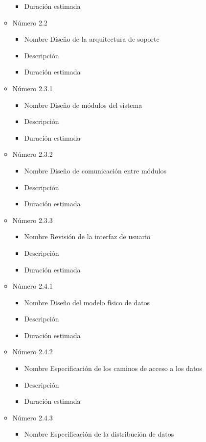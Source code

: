 \documentclass[11pt,a4paper,spanish,twoside]{report}
\begin{document}
\begin{itemize}
\begin{itemize}
\begin{itemize}
\item{Duración estimada} 
\end{itemize}
\item{Número} 2.2
\begin{itemize}
\item{Nombre} Diseño de la arquitectura de soporte
\item{Descripción}
\item{Duración estimada} 
\end{itemize}
\item{Número} 2.3.1
\begin{itemize}
\item{Nombre} Diseño de módulos del sistema
\item{Descripción}
\item{Duración estimada} 
\end{itemize}
\item{Número} 2.3.2
\begin{itemize}
\item{Nombre} Diseño de comunicación entre módulos
\item{Descripción}
\item{Duración estimada} 
\end{itemize}
\item{Número} 2.3.3
\begin{itemize}
\item{Nombre} Revisión de la interfaz de usuario
\item{Descripción}
\item{Duración estimada} 
\end{itemize}
\item{Número} 2.4.1
\begin{itemize}
\item{Nombre} Diseño del modelo físico de datos
\item{Descripción}
\item{Duración estimada} 
\end{itemize}
\item{Número} 2.4.2
\begin{itemize}
\item{Nombre} Especificación de los caminos de acceso a los datos
\item{Descripción}
\item{Duración estimada} 
\end{itemize}
\item{Número} 2.4.3
\begin{itemize}
\item{Nombre} Especificación de la distribución de datos

\end{itemize}
\end{itemize}
\end{itemize}
\end{document}
